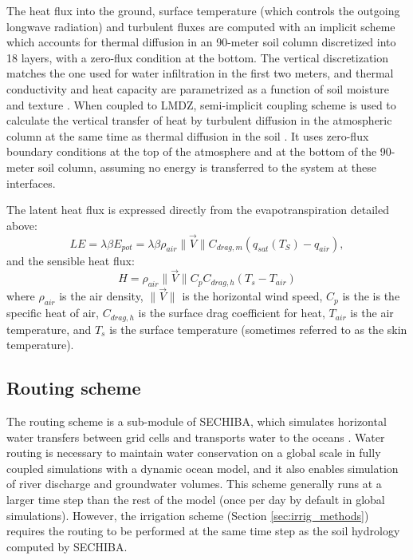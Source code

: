 The heat flux into the ground, surface temperature (which controls the outgoing longwave radiation) and turbulent fluxes are computed with an implicit scheme which accounts for thermal diffusion in an 90-meter soil column discretized into 18 layers, with a zero-flux condition at the bottom. 
The vertical discretization matches the one used for water infiltration in the first two meters, and thermal conductivity and heat capacity are parametrized as a function of soil moisture and texture \citep{wang_improvement_2016}.
When coupled to LMDZ, semi-implicit coupling scheme is used to calculate the vertical transfer of heat by turbulent diffusion in the atmospheric column at the same time as thermal diffusion in the soil \citep{polcher_proposal_1998, Hourdin_phdthesis, hourdin_parameterization_2002, dufresne2009description}.
 It uses zero-flux boundary conditions at the top of the atmosphere and at the bottom of the 90-meter soil column, assuming no energy is transferred to the system at these interfaces.

The latent heat flux is expressed directly from the evapotranspiration detailed above:
\begin{equation}
    LE = \lambda \beta E_{pot} = \lambda \beta \rho_{air} \lVert \vec{V} \rVert C_{drag, m} (q_{sat}(T_S) - q_{air}),
\end{equation}
and the sensible heat flux:
\begin{equation}
    H = \rho_{air}  \lVert \vec{V} \rVert C_p C_{drag, h} (T_{s} - T_{air})
\end{equation}
where $\rho_{air}$ is the air density, $\lVert \vec{V} \rVert$ is the horizontal wind speed, $C_p$ is the is the specific heat of air, $C_{drag, h}$ is the surface drag coefficient for heat, $T_{air}$ is the air temperature, and $T_{s}$ is the surface temperature (sometimes referred to as the skin temperature).

\subsection{Routing scheme}
\label{section:routing_methods}
The routing scheme is a sub-module of SECHIBA, which simulates horizontal water transfers between grid cells and transports water to the oceans \citep{ducharne_development_2003, ngo-duc_validation_2007}. 
Water routing is necessary to maintain water conservation on a global scale in fully coupled simulations with a dynamic ocean model, and it also enables simulation of river discharge and groundwater volumes. 
This scheme generally runs at a larger time step than the rest of the model (once per day by default in global simulations). However, the irrigation scheme (Section \ref{sec:irrig_methods}) requires the routing to be performed at the same time step as the soil hydrology computed by SECHIBA. 

